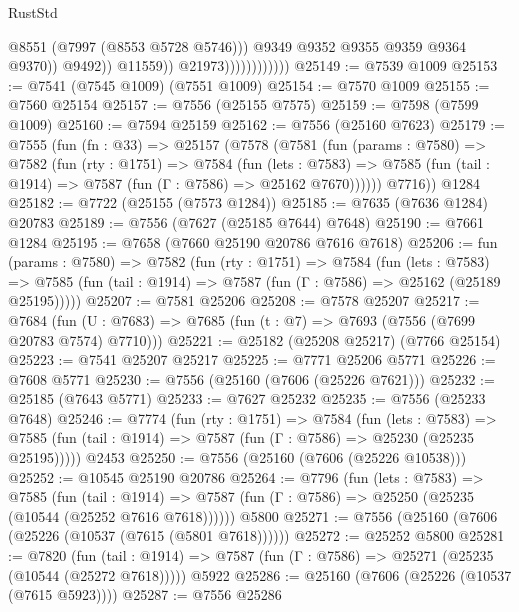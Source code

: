 \begin{lexlean}{RustStd}
\begin{coremodule}
                                          @8551
                                          (@7997 (@8553 @5728 @5746)))
                                        @9349
                                        @9352
                                        @9355
                                        @9359
                                        @9364
                                        @9370))
                                    @9492))
                                @11559))
                            @21973))))))))))))
@25149 := @7539 @1009
@25153 := @7541 (@7545 @1009) (@7551 @1009)
@25154 := @7570 @1009
@25155 := @7560 @25154
@25157 := @7556 (@25155 @7575)
@25159 := @7598 (@7599 @1009)
@25160 := @7594 @25159
@25162 := @7556 (@25160 @7623)
@25179 := @7555
    (fun (fn : @33) =>
    @25157
      (@7578
        (@7581
          (fun (params : @7580) =>
          @7582
            (fun (rty : @1751) =>
            @7584
              (fun (lets : @7583) =>
              @7585 (fun (tail : @1914) => @7587 (fun (Γ : @7586) => @25162 @7670))))))
        @7716))
    @1284
@25182 := @7722 (@25155 (@7573 @1284))
@25185 := @7635 (@7636 @1284) @20783
@25189 := @7556 (@7627 (@25185 @7644) @7648)
@25190 := @7661 @1284
@25195 := @7658 (@7660 @25190 @20786 @7616 @7618)
@25206 := fun (params : @7580) =>
  @7582
    (fun (rty : @1751) =>
    @7584
      (fun (lets : @7583) =>
      @7585 (fun (tail : @1914) => @7587 (fun (Γ : @7586) => @25162 (@25189 @25195)))))
@25207 := @7581 @25206
@25208 := @7578 @25207
@25217 := @7684
    (fun (U : @7683) => @7685 (fun (t : @7) => @7693 (@7556 (@7699 @20783 @7574) @7710)))
@25221 := @25182 (@25208 @25217) (@7766 @25154)
@25223 := @7541 @25207 @25217
@25225 := @7771 @25206 @5771
@25226 := @7608 @5771
@25230 := @7556 (@25160 (@7606 (@25226 @7621)))
@25232 := @25185 (@7643 @5771)
@25233 := @7627 @25232
@25235 := @7556 (@25233 @7648)
@25246 := @7774
    (fun (rty : @1751) =>
    @7584
      (fun (lets : @7583) =>
      @7585 (fun (tail : @1914) => @7587 (fun (Γ : @7586) => @25230 (@25235 @25195)))))
    @2453
@25250 := @7556 (@25160 (@7606 (@25226 @10538)))
@25252 := @10545 @25190 @20786
@25264 := @7796
    (fun (lets : @7583) =>
    @7585
      (fun (tail : @1914) =>
      @7587 (fun (Γ : @7586) => @25250 (@25235 (@10544 (@25252 @7616 @7618))))))
    @5800
@25271 := @7556 (@25160 (@7606 (@25226 (@10537 (@7615 (@5801 @7618))))))
@25272 := @25252 @5800
@25281 := @7820
    (fun (tail : @1914) => @7587 (fun (Γ : @7586) => @25271 (@25235 (@10544 (@25272 @7618)))))
    @5922
@25286 := @25160 (@7606 (@25226 (@10537 (@7615 @5923))))
@25287 := @7556 @25286

\end{coremodule}
\end{lexlean}

